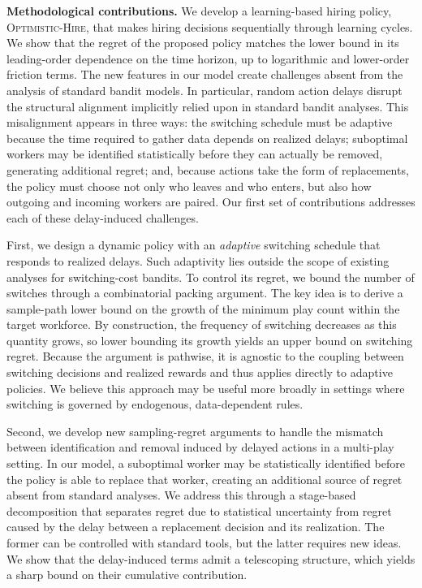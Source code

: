\documentclass[opre,blindrev]{informs3}
\begin{document}
{\bf Methodological contributions.}
We develop a learning-based hiring policy, \textsc{Optimistic-Hire}, that makes hiring decisions sequentially through learning cycles. We show that the regret of the proposed policy matches the lower bound in its leading-order dependence on the time horizon, up to logarithmic and lower-order friction terms. 
The new features in our model create
challenges absent from the analysis of standard bandit models. 
In particular, random action delays disrupt the structural alignment implicitly relied upon in standard bandit analyses. This misalignment appears in three ways: the switching schedule must be adaptive because the time required to gather data depends on realized delays; suboptimal workers may be identified statistically before they can actually be removed, generating additional regret; and, because actions take the form of replacements, the policy must choose not only who leaves and who enters, but also how outgoing and incoming workers are paired. Our first set of contributions addresses each of these delay-induced challenges.

First, we design a dynamic policy with an \emph{adaptive} switching schedule that responds to realized delays. Such adaptivity lies outside the scope of existing analyses for switching-cost bandits. To control its regret, we bound the number of switches through a combinatorial packing argument. The key idea is to derive a sample-path lower bound on the growth of the minimum play count within the target workforce. By construction, the frequency of switching decreases as this quantity grows, so lower bounding its growth yields an upper bound on switching regret. Because the argument is pathwise, it is agnostic to the coupling between switching decisions and realized rewards and thus applies directly to adaptive policies. We believe this approach may be useful more broadly in settings where switching is governed by endogenous, data-dependent rules.

Second, we develop new sampling-regret arguments to handle the mismatch between identification and removal induced by delayed actions in a multi-play setting. In our model, a suboptimal worker may be statistically identified before the policy is able to replace that worker, creating an additional source of regret absent from standard analyses. We address this through a stage-based decomposition that separates regret due to statistical uncertainty from regret caused by the delay between a replacement decision and its realization. The former can be controlled with standard tools, but the latter requires new ideas. We show that the delay-induced terms admit a telescoping structure, which yields a sharp bound on their cumulative contribution.
\end{document}
